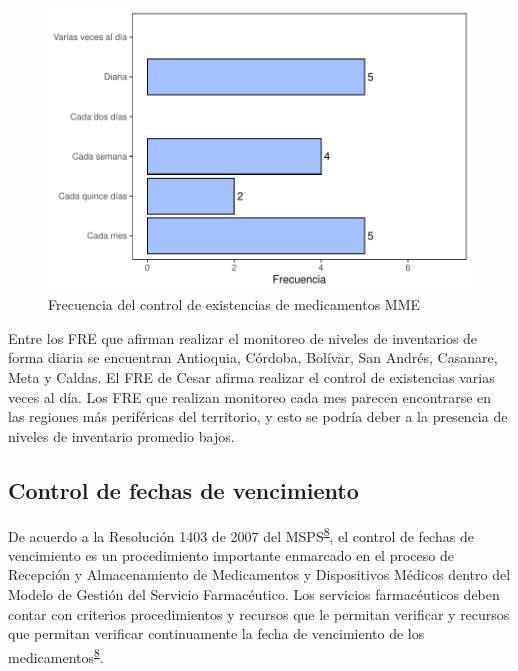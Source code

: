 \documentclass[
]{book}
\begin{document}
\begin{figure}
\includegraphics[width=1\linewidth]{InformeFinal_files/figure-latex/FrecControlExistencias-1} \caption{Frecuencia del control de existencias de medicamentos MME}\label{fig:FrecControlExistencias}
\end{figure}

Entre los FRE que afirman realizar el monitoreo de niveles de inventarios de forma diaria se encuentran Antioquia, Córdoba, Bolívar, San Andrés, Casanare, Meta y Caldas. El FRE de Cesar afirma realizar el control de existencias varias veces al día. Los FRE que realizan monitoreo cada mes parecen encontrarse en las regiones más periféricas del territorio, y esto se podría deber a la presencia de niveles de inventario promedio bajos.

\hypertarget{control-de-fechas-de-vencimiento}{%
\subsection{Control de fechas de vencimiento}\label{control-de-fechas-de-vencimiento}}

De acuerdo a la Resolución 1403 de 2007 del MSPS\textsuperscript{\protect\hyperlink{ref-MinisteriodeSaludyProteccionSocial2007}{8}}, el control de fechas de vencimiento es un procedimiento importante enmarcado en el proceso de Recepción y Almacenamiento de Medicamentos y Dispositivos Médicos dentro del Modelo de Gestión del Servicio Farmacéutico. Los servicios farmacéuticos deben contar con criterios procedimientos y recursos que le permitan verificar y recursos que permitan verificar continuamente la fecha de vencimiento de los medicamentos\textsuperscript{\protect\hyperlink{ref-MinisteriodeSaludyProteccionSocial2007}{8}}.
\end{document}
